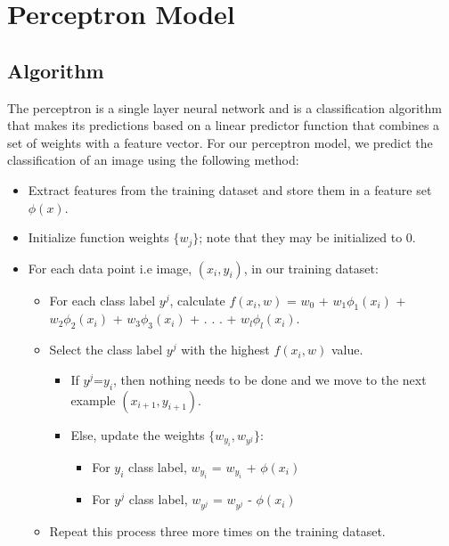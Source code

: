 \documentclass[10pt,parskip=half,
toc=sectionentrywithdots,
bibliography=totocnumbered,
captions=tableheading,numbers=noendperiod]{scrartcl}
\providecommand{\tightlist}{%
  \setlength{\itemsep}{0pt}\setlength{\parskip}{0pt}}
\begin{document}
\hypertarget{perceptron-model}{%
\section{Perceptron Model}\label{perceptron-model}}

\hypertarget{algorithm}{%
\subsection{Algorithm}\label{algorithm}}

The perceptron is a single layer neural network and is a classification
algorithm that makes its predictions based on a linear predictor
function that combines a set of weights with a feature vector. For our
perceptron model, we predict the classification of an image using the
following method:

\begin{itemize}
\tightlist
\item
  Extract features from the training dataset and store them in a feature
  set \({\phi}(x)\).
\item
  Initialize function weights \({\{w_j\}}\); note that they may be
  initialized to \(0\).
\item
  For each data point i.e image, \((x_i,y_i)\), in our training dataset:

  \begin{itemize}
  \tightlist
  \item
    For each class label \(y^j\), calculate \(f(x_i,w)\) = \(w_0\) +
    \(w_1{\phi}_1(x_i)\) + \(w_2{\phi}_2(x_i)\) + \(w_3{\phi}_3(x_i)\) +
    . . . + \(w_l{\phi}_l(x_i)\).
  \item
    Select the class label \(y^j\) with the highest \(f(x_i,w)\) value.

    \begin{itemize}
    \tightlist
    \item
      If \(y^j\)=\(y_i\), then nothing needs to be done and we move to
      the next example \((x_{i+1},y_{i+1})\).
    \item
      Else, update the weights \(\{w_{y_i},w_{y^j}\}\):

      \begin{itemize}
      \tightlist
      \item
        For \(y_i\) class label, \(w_{y_i}\) = \(w_{y_i}\) +
        \(\phi(x_i)\)
      \item
        For \(y^j\) class label, \(w_{y^j}\) = \(w_{y^j}\) -
        \(\phi(x_i)\)
      \end{itemize}
    \end{itemize}
  \item
    Repeat this process three more times on the training dataset.
  \end{itemize}
\end{itemize}
\end{document}
